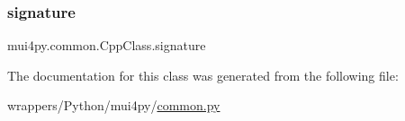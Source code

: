 \mbox{\label{classmui4py_1_1common_1_1_cpp_class_acab1a6431c2c8d5c1ca73bd643199ff4}} 
\subsubsection{\texorpdfstring{signature}{signature}}
{\footnotesize\ttfamily mui4py.\+common.\+Cpp\+Class.\+signature}



The documentation for this class was generated from the following file\+:\begin{DoxyCompactItemize}
\item 
wrappers/\+Python/mui4py/\hyperlink{common_8py}{common.\+py}\end{DoxyCompactItemize}
